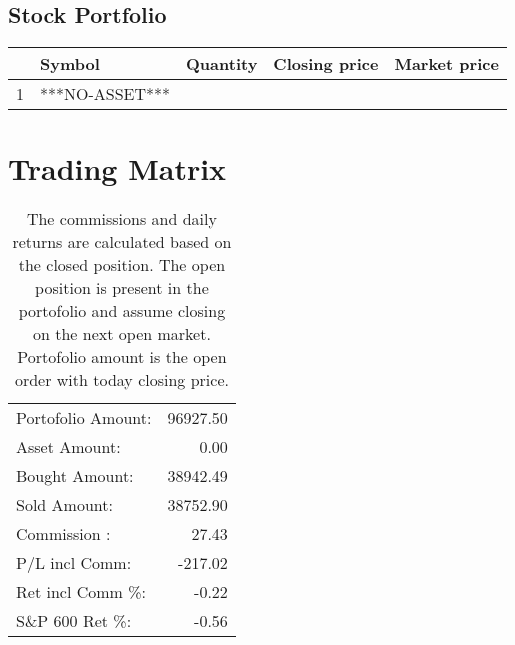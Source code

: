 \documentclass{tufte-handout}\usepackage[]{graphicx}\usepackage[]{color}
\begin{document}
\subsection{Stock Portfolio}
\begin{table}[ht]
\centering
\begin{tabular}{llrrr}
  \hline
 & Symbol & Quantity & Closing price & Market price \\ 
  \hline
1 & ***NO-ASSET*** &  &  &  \\ 
   \hline
\end{tabular}
\end{table}



\section{Trading Matrix}

\begin{table}[ht]
\begin{tabular}{lr}
   \hline
Portofolio Amount: & 96927.50 \\ 
  Asset Amount: & 0.00 \\ 
  Bought Amount: & 38942.49 \\ 
  Sold   Amount: & 38752.90 \\ 
  Commission   : & 27.43 \\ 
  P/L incl Comm: & -217.02 \\ 
  Ret incl Comm \%: & -0.22 \\ 
  S\&P 600 Ret \%: & -0.56 \\ 
   \hline
\end{tabular}
\caption{The commissions and daily returns are calculated based on the closed position.
The open position is present in the portofolio and assume closing on the next open market.
Portofolio amount is the open order with today closing price.} 
\end{table}



% 
% 
\end{document}
